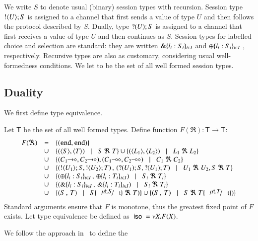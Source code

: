 We write $S$ to denote usual (binary) session types with recursion. 
Session type $! \langle U \rangle ; S$ is assigned to a channel that first sends a 
value of type $U$ and then follows
the protocol described by $S$.
Dually, type $? (U) ; S$ is assigned to a channel  
that first receives a value of type $U$ and then continues as $S$. 
Session types for labelled choice and selection are standard: they are 
written $\& \{l_i:S_i\}_{i \in I}$ and $\oplus \{l_i:S_i\}_{i \in I}$ , respectively. 
Recursive types are also as customary, considering usual 
well-formedness conditions. We let \ST to be the set of
all well formed session types.

\subsection{Duality}
We first define type equivalence.
%
\begin{definition}\rm
\label{def:type_equiv}
	Let $\mathsf{T}$ be the set of all well formed types.
	Define function $F(\Re): \mathsf{T} \longrightarrow \mathsf{T}$:
	\[
		\begin{array}{rcl}
			F(\Re) 	&=&	\set{(\tinact, \tinact)} \\
				&\cup&	\set{(\chtype{S}, \chtype{T}) \bnfbar S\ \Re\ T} \cup \set{(\chtype{L_1}, \chtype{L_2}) \bnfbar L_1\ \Re\ L_2}\\
				&\cup&	\set{(\shot{C_1}, \shot{C_2}), (\lhot{C_1}, \lhot{C_2}) \bnfbar C_1\ \Re\ C_2}\\
				&\cup&	\set{(\btout{U_1} S, \btout{U_2} T)\,,\, (\btinp{U_1} S, \btinp{U_1} T) \bnfbar U_1\ \Re\ U_2, S\ \Re\ T}\\
				&\cup&	\set{(\btsel{l_i: S_i}_{i \in I} \,,\, \btsel{l_i: T_i}_{i \in I}) \bnfbar  S_i\ \Re\ T_i}\\
				&\cup&	\set{(\btbra{l_i: S_i}_{i \in I}\,,\, \btbra{l_i: T_i}_{i \in I}) \bnfbar S_i\ \Re\ T_i}\\
				&\cup&	\set{(S\,,\, T) \bnfbar S\subst{\trec{t}{S}}{\vart{t}}\ \Re\ T)}
				\cup	\set{(S\,,\, T) \bnfbar S\ \Re\ T\subst{\trec{t}{T}}{\vart{t}})}
		\end{array}
	\]	
	\noi Standard arguments ensure that $F$ is monotone, thus the greatest fixed point
	of $F$ exists. Let type equivalence be defined as $\ \mathsf{iso}\  = \nu X. F(X)$.
\end{definition}
%
We follow the approach in~\cite{onSessionDualityBDGK} to define the 
